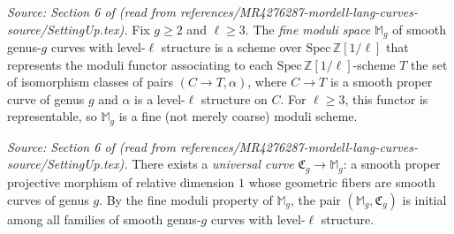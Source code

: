 \begin{definition}
  \label{def:Mg_level}
  \textit{Source: Section 6 of \cite{MR4276287-mordell-lang-curves} (read from references/MR4276287-mordell-lang-curves-source/SettingUp.tex).}
  Fix \(g \ge 2\) and \(\ell \ge 3\). The \emph{fine moduli space} \(\mathbb{M}_g\) of smooth
  genus-\(g\) curves with level-\(\ell\) structure is a scheme over
  \(\mathrm{Spec}\,\mathbb{Z}[1/\ell]\) that represents the moduli functor
  associating to each \(\mathrm{Spec}\,\mathbb{Z}[1/\ell]\)-scheme \(T\) the set of
  isomorphism classes of pairs \((C \to T, \alpha)\), where \(C \to T\) is a smooth proper
  curve of genus \(g\) and \(\alpha\) is a level-\(\ell\) structure on \(C\). For \(\ell \ge 3\),
  this functor is representable, so \(\mathbb{M}_g\) is a fine (not merely coarse) moduli scheme.
\end{definition}

\begin{definition}
  \label{def:universal_curve}
  \textit{Source: Section 6 of \cite{MR4276287-mordell-lang-curves} (read from references/MR4276287-mordell-lang-curves-source/SettingUp.tex).}
  There exists a \emph{universal curve} \(\mathfrak{C}_g \to \mathbb{M}_g\): a smooth proper
  projective morphism of relative dimension \(1\) whose geometric fibers are smooth curves of
  genus \(g\). By the fine moduli property of \(\mathbb{M}_g\), the pair
  \((\mathbb{M}_g, \mathfrak{C}_g)\) is initial among all families of smooth genus-\(g\) curves
  with level-\(\ell\) structure.
\end{definition}

